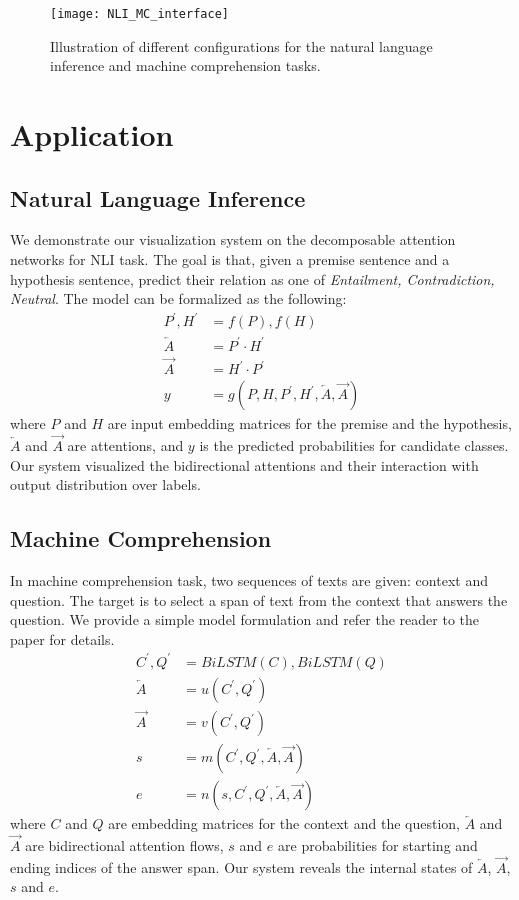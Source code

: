 \begin{figure*}[t]
\centering
\vspace{-2mm}
 \texttt{[image: NLI\_MC\_interface]}
  \vspace{-6mm}
 \caption{
Illustration of different configurations for the natural language inference and machine comprehension tasks.
}
\label{fig:pipelineUpdate}
\end{figure*}

\section{Application}


\subsection{Natural Language Inference}
We demonstrate our visualization system on the decomposable attention networks
for NLI task. The goal is that, given a premise sentence and a hypothesis sentence,
predict their relation as one of \emph{Entailment, Contradiction, Neutral}.
The model can be formalized as the following:
\begin{align}
	P^\prime, H^\prime &= f(P), f(H)\\
	\overleftarrow{A} &= P^\prime \cdot H^\prime\\
	\overrightarrow{A} &= H^\prime \cdot P^\prime\\
	y &= g(P, H, P^\prime, H^\prime, \overleftarrow{A}, \overrightarrow{A})
\end{align}
where $P$ and $H$ are input embedding matrices for the premise and the hypothesis, $\overleftarrow{A}$
and $\overrightarrow{A}$ are attentions, and $y$ is the predicted probabilities for candidate classes.
Our system visualized the bidirectional attentions and their interaction with output distribution over labels.


\subsection{Machine Comprehension}
In machine comprehension task, two sequences of texts are given: context and question.
The target is to select a span of text from the context that answers the question. We provide a simple model
formulation and refer the reader to the paper for details.
\begin{align}
	C^\prime, Q^\prime &= BiLSTM(C), BiLSTM(Q)\\
	\overleftarrow{A} &= u(C^\prime, Q^\prime)\\
	\overrightarrow{A} &= v(C^\prime, Q^\prime)\\
	s &= m(C^\prime, Q^\prime, \overleftarrow{A}, \overrightarrow{A})\\
	e &= n(s, C^\prime, Q^\prime, \overleftarrow{A}, \overrightarrow{A})
\end{align}
where $C$ and $Q$ are embedding matrices for the context and the question,
$\overleftarrow{A}$ and $\overrightarrow{A}$ are bidirectional attention flows,
$s$ and $e$ are probabilities for starting and ending indices of the answer span.
Our system reveals the internal states of $\overleftarrow{A}$, $\overrightarrow{A}$,
$s$ and $e$.
